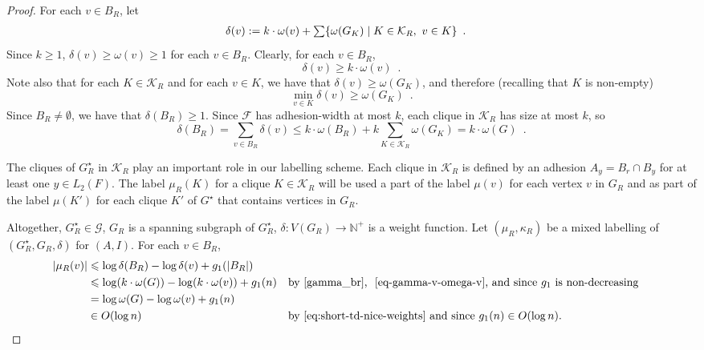 \documentclass[twoside,leqno]{article}
\newcommand{\N}{\mathbb{N}}
\let\eqref\cref
\renewcommand{\ge}{\geqslant}
\renewcommand{\le}{\leqslant}
\renewcommand{\geq}{\geqslant}
\newcommand{\Oh}{O}
\DeclarePairedDelimiter{\set}{\{}{\}}
\begin{document}
\begin{proof}
  For each $v\in B_R$, let
  \begin{align*}
    \delta(v)
     & :=k\cdot\omega(v)+\textstyle\sum\set{\omega(G_K)\mid K\in\mathcal{K}_R,\ v\in K} \enspace .
  \end{align*}
  Since $k\geq1$, $\delta(v)\geq\omega(v)\geq 1$ for each $v\in B_R$.
  Clearly, for each $v\in B_R$,
  \begin{equation}
    \label{eq-gamma-v-omega-v}
    \delta(v) \geq k\cdot\omega(v)\enspace.
  \end{equation}
  Note also that for each $K\in\mathcal{K}_R$ and for each $v\in K$, we have that $\delta(v)\ge \omega(G_K)$, and therefore (recalling that $K$ is non-empty)
  \begin{equation}
    \min_{v\in K}\delta(v) \ge \omega(G_K) \enspace . \label{gamma_v_lower_bound}
  \end{equation}
  Since $B_R\neq\emptyset$, we have that $\delta(B_R)\geq1$.
  Since $\mathcal{F}$ has adhesion-width at most $k$, each clique in $\mathcal{K}_R$ has size at most $k$, so
  \begin{equation}
    \delta(B_R)=\sum_{v\in B_R}\delta(v)
    \le k\cdot\omega(B_R) + k\sum_{K\in\mathcal{K}_R}\omega(G_K)
    = k\cdot\omega(G)  \enspace . \label{gamma_br}
  \end{equation}

  The cliques of $G^\star_R$ in $\mathcal{K}_R$ play an important role in our labelling scheme.
  Each clique in $\mathcal{K}_R$ is defined by an adhesion $A_y=B_r\cap B_y$ for at least one $y\in L_2(F)$.  The label $\mu_R(K)$ for a clique $K\in\mathcal{K}_R$ will be used a part of the label $\mu(v)$ for each vertex $v$ in $G_R$ and as part of the label $\mu(K')$ for each clique $K'$ of $G^\star$ that contains vertices in $G_R$.

  Altogether, $G^\star_R\in\mathcal{G}$, $G_R$ is a spanning subgraph of $G^\star_R$, $\delta:V(G_R)\to\N^+$ is a weight function. Let $(\mu_R,\kappa_R)$ be a mixed labelling of $(G^\star_R, G_R, \delta)$ for $(A, I)$. For each $v\in B_R$,
  \begin{align}
    |\mu_R(v)|
     & \le \log \delta(B_R)-\log\delta(v)+g_1(|B_R|)\notag                                                                                                                              \\
     & \le \log (k\cdot\omega(G)) - \log (k\cdot\omega(v)) + g_1(n)             &  & \textrm{by~\eqref{gamma_br}, ~\eqref{eq-gamma-v-omega-v}, and since $g_1$ is non-decreasing}\notag \\
     & = \log\omega(G) - \log\omega(v) + g_1(n)\label{eq:mu-R-bounded-in-omega}                                                                                                         \\
     & \in\Oh(\log n)                                                           &  & \textrm{by~\eqref{eq:short-td-nice-weights} and since $g_1(n)\in\Oh(\log n)$.}
    \label{eq:mu-R-in-logn}
  \end{align}


\end{proof}
\end{document}
